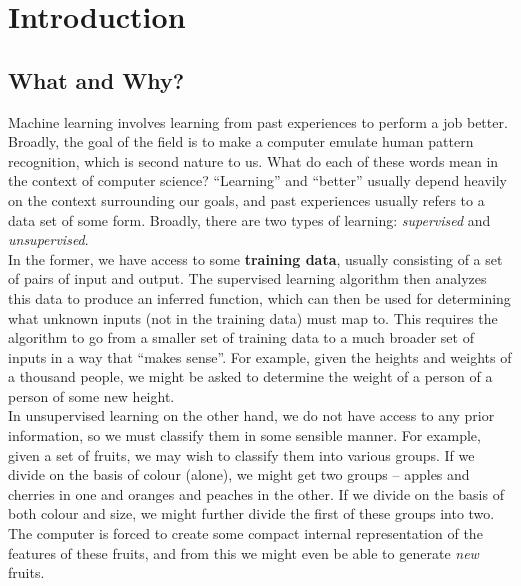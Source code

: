 \documentclass{article}
\begin{document}
\thispagestyle{empty}

\titleBC
\tableofcontents
\clearpage

\setcounter{section}{-1}


% 

\section{Introduction}

	\subsection{What and Why?}

		Machine learning involves learning from past experiences to perform a job better.\\
		Broadly, the goal of the field is to make a computer emulate human pattern recognition, which is second nature to us.
		What do each of these words mean in the context of computer science? ``Learning'' and ``better'' usually depend heavily on the context surrounding our goals, and past experiences usually refers to a data set of some form. Broadly, there are two types of learning: \emph{supervised} and \emph{unsupervised}.\\

		In the former, we have access to some \textbf{training data}, usually consisting of a set of pairs of input and output. The supervised learning algorithm then analyzes this data to produce an inferred function, which can then be used for determining what unknown inputs (not in the training data) must map to. This requires the algorithm to go from a smaller set of training data to a much broader set of inputs in a way that ``makes sense''. For example, given the heights and weights of a thousand people, we might be asked to determine the weight of a person of a person of some new height.\\
		In unsupervised learning on the other hand, we do not have access to any prior information, so we must classify them in some sensible manner. For example, given a set of fruits, we may wish to classify them into various groups. If we divide on the basis of colour (alone), we might get two groups -- apples and cherries in one and oranges and peaches in the other. If we divide on the basis of both colour and size, we might further divide the first of these groups into two. The computer is forced to create some compact internal representation of the features of these fruits, and from this we might even be able to generate \emph{new} fruits.\\
\end{document}
